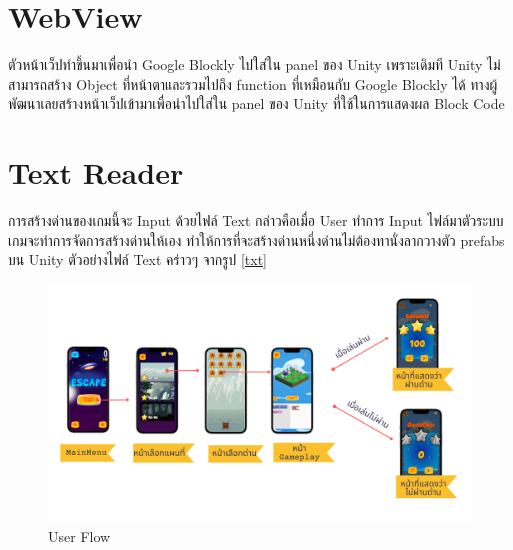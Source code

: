 \section{WebView}
ตัวหน้าเว็ปทำขึ้นมาเพื่อนำ Google Blockly ไปใส่ใน panel ของ Unity เพราะเดิมที Unity ไม่สามารถสร้าง Object ที่หน้าตาและรวมไปถึง function ที่เหมือนกับ Google Blockly ได้ ทางผู้พัฒนาเลยสร้างหน้าเว็ปเข้ามาเพื่อนำไปใส่ใน 
panel ของ Unity ที่ใช้ในการแสดงผล Block Code

\section{Text Reader}
การสร้างด่านของเกมนี้จะ Input ด้วยไฟล์ Text กล่าวคือเมื่อ User ทำการ Input ไฟล์มาตัวระบบเกมจะทำการจัดการสร้างด่านให้เอง
ทำให้การที่จะสร้างด่านหนึ่งด่านไม่ต้องทานั่งลากวางตัว prefabs บน Unity ตัวอย่างไฟล์ Text คร่าวๆ จากรูป \ref{txt}

\begin{figure}[h!]
\begin{center}
\includegraphics [scale=.35] {pic/UXflowchart.png}
\end{center}
\caption[User Flow]{User Flow}
\label{userflow}
\end{figure}


